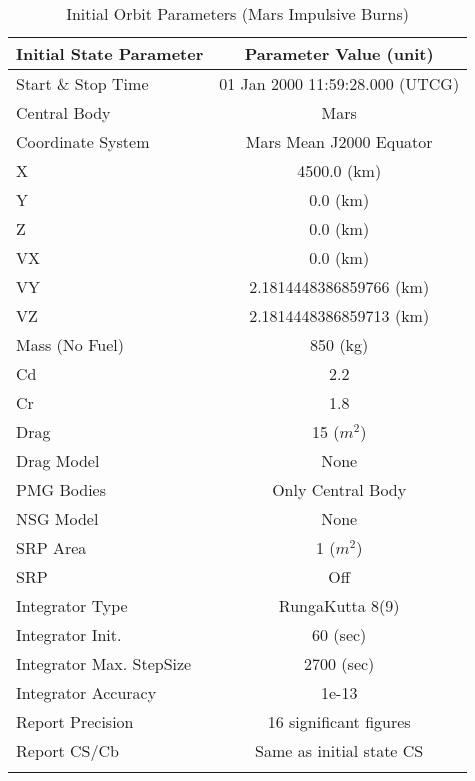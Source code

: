 \begin{table}[htbp!]
\centering \caption{Initial Orbit Parameters (Mars Impulsive Burns)}
      \begin{tabular}{lc}
      \hline\hline
            Initial State Parameter & Parameter Value (unit)\\
            \hline
            Start \& Stop Time & 01 Jan 2000 11:59:28.000 (UTCG)\\
            Central Body & Mars\\
            Coordinate System & Mars Mean J2000 Equator\\
            X & 4500.0 (km)\\
            Y & 0.0 (km)\\
            Z & 0.0 (km)\\
            VX & 0.0 (km)\\
            VY & 2.1814448386859766 (km)\\
            VZ & 2.1814448386859713 (km)\\
            Mass (No Fuel) & 850 (kg)\\
            Cd & 2.2\\
            Cr & 1.8\\
            Drag & 15 ($m^2$)\\
            Drag Model & None\\
            PMG Bodies & Only Central Body\\
            NSG Model & None\\
            SRP Area & 1 ($m^2$)\\
            SRP & Off\\
            Integrator Type & RungaKutta 8(9)\\
            Integrator Init. & 60 (sec)\\
            Integrator Max. StepSize & 2700 (sec)\\
            Integrator Accuracy & 1e-13\\
            Report Precision & 16 significant figures\\
            Report CS/Cb & Same as initial state CS\\
      \hline\hline
      \label{Table: InitDVStateMarsImpulse}
\end{tabular}
\end{table}

